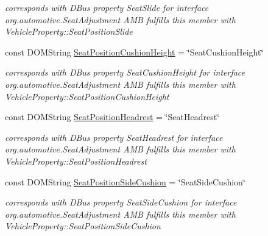 \begin{DoxyCompactItemize}
\begin{DoxyCompactList}\small\item\em corresponds with D\+Bus property Seat\+Slide for interface org.\+automotive.\+Seat\+Adjustment A\+M\+B fulfills this member with Vehicle\+Property\+::\+Seat\+Position\+Slide \end{DoxyCompactList}\item 
\hypertarget{interfaceSeatAdjustment_ad4fa353e4948b849011a61324d2d257d}{const D\+O\+M\+String \hyperlink{interfaceSeatAdjustment_ad4fa353e4948b849011a61324d2d257d}{Seat\+Position\+Cushion\+Height} = \char`\"{}Seat\+Cushion\+Height\char`\"{}}\label{interfaceSeatAdjustment_ad4fa353e4948b849011a61324d2d257d}

\begin{DoxyCompactList}\small\item\em corresponds with D\+Bus property Seat\+Cushion\+Height for interface org.\+automotive.\+Seat\+Adjustment A\+M\+B fulfills this member with Vehicle\+Property\+::\+Seat\+Position\+Cushion\+Height \end{DoxyCompactList}\item 
\hypertarget{interfaceSeatAdjustment_adecde776f5f2413bfc213d14d2a492df}{const D\+O\+M\+String \hyperlink{interfaceSeatAdjustment_adecde776f5f2413bfc213d14d2a492df}{Seat\+Position\+Headrest} = \char`\"{}Seat\+Headrest\char`\"{}}\label{interfaceSeatAdjustment_adecde776f5f2413bfc213d14d2a492df}

\begin{DoxyCompactList}\small\item\em corresponds with D\+Bus property Seat\+Headrest for interface org.\+automotive.\+Seat\+Adjustment A\+M\+B fulfills this member with Vehicle\+Property\+::\+Seat\+Position\+Headrest \end{DoxyCompactList}\item 
\hypertarget{interfaceSeatAdjustment_a97645db443fc452ed3249b164c0b5df4}{const D\+O\+M\+String \hyperlink{interfaceSeatAdjustment_a97645db443fc452ed3249b164c0b5df4}{Seat\+Position\+Side\+Cushion} = \char`\"{}Seat\+Side\+Cushion\char`\"{}}\label{interfaceSeatAdjustment_a97645db443fc452ed3249b164c0b5df4}

\begin{DoxyCompactList}\small\item\em corresponds with D\+Bus property Seat\+Side\+Cushion for interface org.\+automotive.\+Seat\+Adjustment A\+M\+B fulfills this member with Vehicle\+Property\+::\+Seat\+Position\+Side\+Cushion \end{DoxyCompactList}\end{DoxyCompactItemize}


